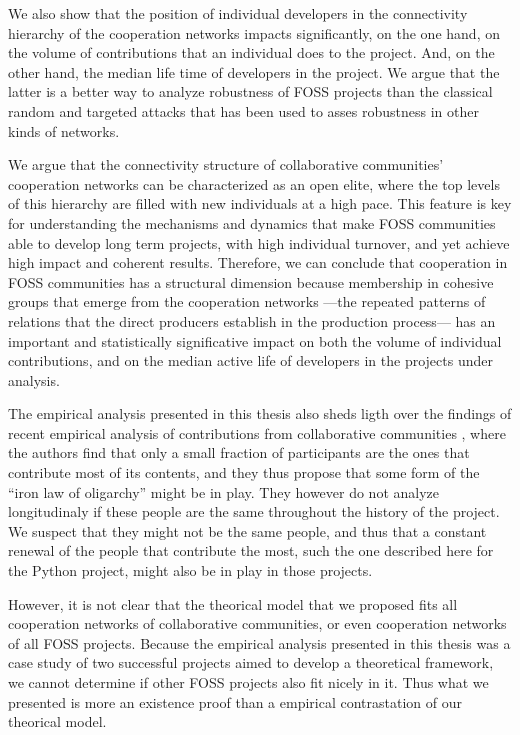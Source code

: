 We also show that the position of individual developers in the connectivity hierarchy of the cooperation networks impacts significantly, on the one hand, on the volume of contributions that an individual does to the project. And, on the other hand, the median life time of developers in the project. We argue that the latter is a better way to analyze robustness of FOSS projects than the classical random and targeted attacks that has been used to asses robustness in other kinds of networks.

We argue that the connectivity structure of collaborative communities' cooperation networks can be characterized as an open elite, where the top levels of this hierarchy are filled with new individuals at a high pace. This feature is key for understanding the mechanisms and dynamics that make FOSS communities able to develop long term projects, with high individual turnover, and yet achieve high impact and coherent results. Therefore, we can conclude that cooperation in FOSS communities has a structural dimension because membership in cohesive groups that emerge from the cooperation networks ---the repeated patterns of relations that the direct producers establish in the production process--- has an important and statistically significative impact on both the volume of individual contributions, and on the median active life of developers in the projects under analysis.

The empirical analysis presented in this thesis also sheds ligth over the findings of recent empirical analysis of contributions from collaborative communities \citep{shaw:2014}, where the authors find that only a small fraction of participants are the ones that contribute most of its contents, and they thus propose that some form of the ``iron law of oligarchy'' \citep{michels:1915} might be in play. They however do not analyze longitudinaly if these people are the same throughout the history of the project. We suspect that they might not be the same people, and thus that a constant renewal of the people that contribute the most, such the one described here for the Python project, might also be in play in those projects. 

However, it is not clear that the theorical model that we proposed fits all cooperation networks of collaborative communities, or even cooperation networks of all FOSS projects. Because the empirical analysis presented in this thesis was a case study of two successful projects aimed to develop a theoretical framework, we cannot determine if other FOSS projects also fit nicely in it. Thus what we presented is more an existence proof than a empirical contrastation of our theorical model.

